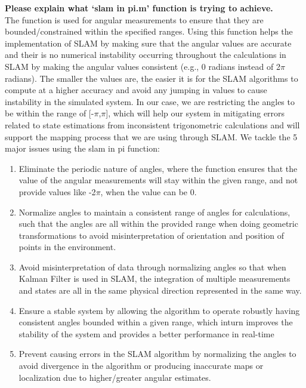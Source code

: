 \textbf{Please explain what ‘slam in pi.m’ function is trying to achieve.}\\
The function is used for angular measurements to ensure that they are bounded/constrained within the specified ranges. Using this function helps the implementation of SLAM by making sure that the angular values are accurate and their is no numerical instability occurring throughout the calculations in SLAM by making the angular values consistent (e.g., 0 radians instead of 2$\pi$ radians). The smaller the values are, the easier it is for the SLAM algorithms to compute at a higher accuracy and avoid any jumping in values to cause instability in the simulated system. In our case, we are restricting the angles to be within the range of [-$\pi$,$\pi$], which will help our system in mitigating errors related to state estimations from inconsistent trigonometric calculations and will support the mapping process that we are using through SLAM. We tackle the 5 major issues using the slam in pi function:
\begin{enumerate}
    \item Eliminate the periodic nature of angles, where the function ensures that the value of the angular measurements will stay within the given range, and not provide values like -2$\pi$, when the value can be 0.
    \item Normalize angles to maintain a consistent range of angles for calculations, such that the angles are all within the provided range when doing geometric transformations to avoid misinterpretation of orientation and position of points in the environment.
    \item Avoid misinterpretation of data through normalizing angles so that when Kalman Filter is used in SLAM, the integration of multiple measurements and states are all in the same physical direction represented in the same way.
    \item Ensure a stable system by allowing the algorithm to operate robustly having consistent angles bounded within a given range, which inturn improves the stability of the system and provides a better performance in real-time
    \item Prevent causing errors in the SLAM algorithm by normalizing the angles to avoid divergence in the algorithm or producing inaccurate maps or localization due to higher/greater angular estimates.
\end{enumerate}\\

